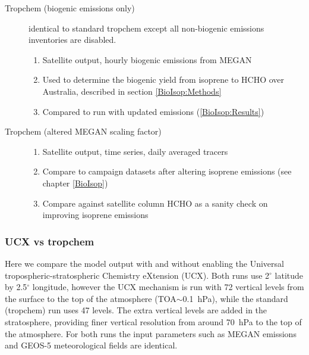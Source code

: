 \begin{description}
        \item [Tropchem (biogenic emissions only)]%
          identical to standard tropchem except all non-biogenic emissions inventories are disabled.
        \begin{enumerate}
          \item Satellite output, hourly biogenic emissions from MEGAN
          \item Used to determine the biogenic yield from isoprene to HCHO over Australia, described in section \ref{BioIsop:Methods}
          \item Compared to run with updated emissions (\ref{BioIsop:Results})
        \end{enumerate}
        
        \item [Tropchem (altered MEGAN scaling factor)]
        \begin{enumerate}
          \item Satellite output, time series, daily averaged tracers
          \item Compare to campaign datasets after altering isoprene emissions (see chapter \ref{BioIsop})
          \item Compare against satellite column HCHO as a sanity check on improving isoprene emissions
        \end{enumerate}
        
      \end{description}
    
    
    
    
    \subsubsection{UCX vs tropchem}
      \label{Model:GC:simulations:comparison}
      
      Here we compare the model output with and without enabling the Universal tropospheric-stratospheric Chemistry eXtension (UCX).
      Both runs use 2$^{\circ}$ latitude by 2.5$^{\circ}$ longitude, however the UCX mechanism is run with 72 vertical levels from the surface to the top of the atmosphere (TOA$\sim$0.1~hPa), while the standard (tropchem) run uses 47 levels.
      The extra vertical levels are added in the stratosphere, providing finer vertical resolution from around 70~hPa to the top of the atmosphere.
      For both runs the input parameters such as MEGAN emissions and GEOS-5 meteorological fields are identical.
      
